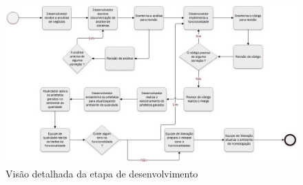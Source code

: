 \documentclass[	DIV=calc,%
							paper=a4,%
							fontsize=12pt,%
							onecolumn]{scrartcl}	 					%
\begin{document}
\begin{figure}
	\centering
	\includegraphics[width=\textwidth]{processo_de_software_BPMN3}
	\caption{Visão detalhada da etapa de desenvolvimento}
	\label{fig2}
\end{figure}
\end{document}

